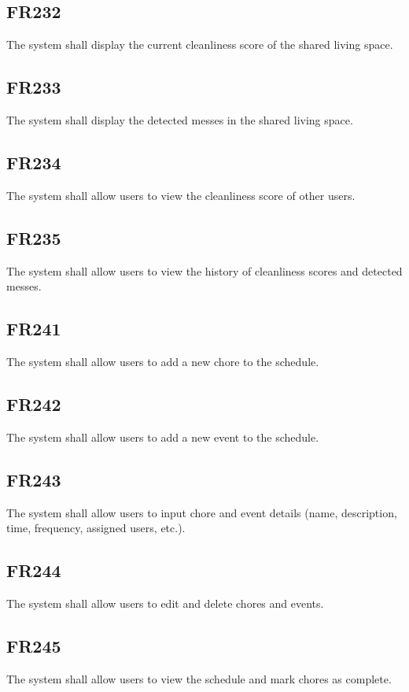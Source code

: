 \documentclass[12pt, titlepage]{article}
\begin{document}
\subsection{FR232}

The system shall display the current cleanliness score of the shared living space.
\subsection{FR233}

The system shall display the detected messes in the shared living space.
\subsection{FR234}

The system shall allow users to view the cleanliness score of other users.

\subsection{FR235}
The system shall allow users to view the history of cleanliness scores and detected messes.

\subsection{FR241}
The system shall allow users to add a new chore to the schedule.

\subsection{FR242}
The system shall allow users to add a new event to the schedule.

\subsection{FR243}
The system shall allow users to input chore and event details (name, description, time, frequency, assigned users, etc.).

\subsection{FR244}
The system shall allow users to edit and delete chores and events.

\subsection{FR245}
The system shall allow users to view the schedule and mark chores as complete.
\end{document}
